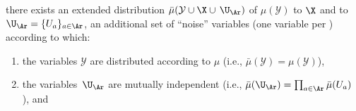 \begin{defn}[\scibility]
    there exists an extended distribution
    $\bar\mu(\mathcal Y \cup \X \cup \,\U_{\Ar})$
    of $\mu(\mathcal Y)$ to 
    $\X$ and
    to\, $\U_{\Ar} = \{ U_a \}_{a \in \Ar}$,
    an additional set of ``noise'' variables 
    (one variable per \arc)
    according to which:
\begin{enumerate}[label=(\alph*),itemsep=0pt,topsep=0.0ex,parsep=0.5ex]
\item 
    the variables $\mathcal Y$ are distributed according to $\mu$
    \hfill(i.e., $\bar\mu(\mathcal Y) = \mu(\mathcal Y)$),
\item
the variables\, $\U_{\Ar} $ are mutually independent
    \hfill (i.e., $\bar\mu(\U_{\Ar} ) = \prod_{a \in \Ar} \bar\mu(U_a)$ ),
    and

\end{enumerate}
\end{defn}
